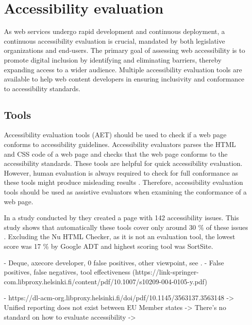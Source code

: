 \chapter{Accessibility evaluation\label{accessibility_evaluation}}

As web services undergo rapid development and continuous deployment, a continuous accessibility evaluation is crucial, mandated by both legislative organizations and end-users. The primary goal of assessing web accessibility is to promote digital inclusion by identifying and eliminating barriers, thereby expanding access to a wider audience. Multiple accessibility evaluation tools are available to help web content developers in ensuring inclusivity and conformance to accessibility standards.

\section{Tools}

Accessibility evaluation tools (AET) should be used to check if a web page conforms to accessibility guidelines. Accessibility evaluators parses the HTML and CSS code of a web page and checks that the web page conforms to the accessibility standards. These tools are helpful for quick accessibility evaluation. However, human evaluation is always required to check for full conformance as these tools might produce misleading results \citep{wcagevaluationtools}. Therefore, accessibility evaluation tools should be used as assistive evaluators when examining the conformance of a web page.

In a study conducted by \cite{govukaccessibilityresults} they created a page with 142 accessibility issues. This study shows that automatically these tools cover only around 30 \% of these issues \citep{govukaccessibilityresults}. Excluding the Nu HTML Checker, as it is not an evaluation tool, the lowest score was 17 \% by Google ADT and highest scoring tool was SortSite. 

- Deque, axecore developer, 0 false positives, other viewpoint, see \cite{dequecoverage}.
- False positives, false negatives, tool effectiveness (https://link-springer-com.libproxy.helsinki.fi/content/pdf/10.1007/s10209-004-0105-y.pdf)




- https://dl-acm-org.libproxy.helsinki.fi/doi/pdf/10.1145/3563137.3563148
-> Unified reporting does not exist between EU Member states
-> There's no standard on how to evaluate accessibility
-> 

